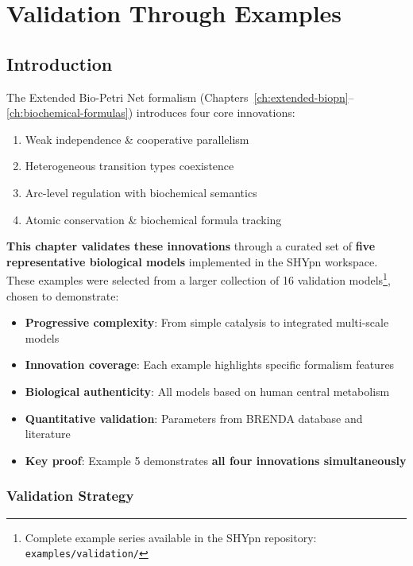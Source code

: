 \chapter{Validation Through Examples}
\label{ch:validation}

\section{Introduction}
\label{sec:validation-intro}

The Extended Bio-Petri Net formalism (Chapters~\ref{ch:extended-biopn}--\ref{ch:biochemical-formulas}) introduces four core innovations:

\begin{enumerate}
    \item Weak independence \& cooperative parallelism
    \item Heterogeneous transition types coexistence
    \item Arc-level regulation with biochemical semantics
    \item Atomic conservation \& biochemical formula tracking
\end{enumerate}

\textbf{This chapter validates these innovations} through a curated set of \textbf{five representative biological models} implemented in the SHYpn workspace. These examples were selected from a larger collection of 16 validation models\footnote{Complete example series available in the SHYpn repository: \texttt{examples/validation/}}, chosen to demonstrate:

\begin{itemize}
    \item \textbf{Progressive complexity}: From simple catalysis to integrated multi-scale models
    \item \textbf{Innovation coverage}: Each example highlights specific formalism features
    \item \textbf{Biological authenticity}: All models based on human central metabolism
    \item \textbf{Quantitative validation}: Parameters from BRENDA database and literature
    \item \textbf{Key proof}: Example 5 demonstrates \textbf{all four innovations simultaneously}
\end{itemize}

\subsection{Validation Strategy}
\label{subsec:validation-strategy}

